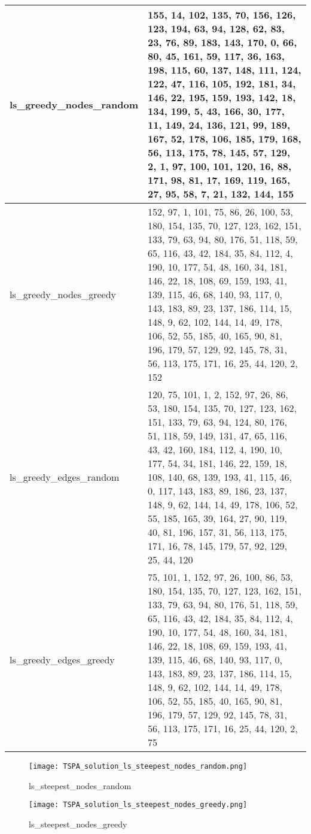 \begin{table}[H]
\begin{tabular}{|p{0.25\linewidth}|p{0.75\linewidth}|}
\hline
ls\_greedy\_nodes\_random & 155, 14, 102, 135, 70, 156, 126, 123, 194, 63, 94, 128, 62, 83, 23, 76, 89, 183, 143, 170, 0, 66, 80, 45, 161, 59, 117, 36, 163, 198, 115, 60, 137, 148, 111, 124, 122, 47, 116, 105, 192, 181, 34, 146, 22, 195, 159, 193, 142, 18, 134, 199, 5, 43, 166, 30, 177, 11, 149, 24, 136, 121, 99, 189, 167, 52, 178, 106, 185, 179, 168, 56, 113, 175, 78, 145, 57, 129, 2, 1, 97, 100, 101, 120, 16, 88, 171, 98, 81, 17, 169, 119, 165, 27, 95, 58, 7, 21, 132, 144, 155 \\
\hline
ls\_greedy\_nodes\_greedy & 152, 97, 1, 101, 75, 86, 26, 100, 53, 180, 154, 135, 70, 127, 123, 162, 151, 133, 79, 63, 94, 80, 176, 51, 118, 59, 65, 116, 43, 42, 184, 35, 84, 112, 4, 190, 10, 177, 54, 48, 160, 34, 181, 146, 22, 18, 108, 69, 159, 193, 41, 139, 115, 46, 68, 140, 93, 117, 0, 143, 183, 89, 23, 137, 186, 114, 15, 148, 9, 62, 102, 144, 14, 49, 178, 106, 52, 55, 185, 40, 165, 90, 81, 196, 179, 57, 129, 92, 145, 78, 31, 56, 113, 175, 171, 16, 25, 44, 120, 2, 152 \\
\hline
ls\_greedy\_edges\_random & 120, 75, 101, 1, 2, 152, 97, 26, 86, 53, 180, 154, 135, 70, 127, 123, 162, 151, 133, 79, 63, 94, 124, 80, 176, 51, 118, 59, 149, 131, 47, 65, 116, 43, 42, 160, 184, 112, 4, 190, 10, 177, 54, 34, 181, 146, 22, 159, 18, 108, 140, 68, 139, 193, 41, 115, 46, 0, 117, 143, 183, 89, 186, 23, 137, 148, 9, 62, 144, 14, 49, 178, 106, 52, 55, 185, 165, 39, 164, 27, 90, 119, 40, 81, 196, 157, 31, 56, 113, 175, 171, 16, 78, 145, 179, 57, 92, 129, 25, 44, 120 \\
\hline
ls\_greedy\_edges\_greedy & 75, 101, 1, 152, 97, 26, 100, 86, 53, 180, 154, 135, 70, 127, 123, 162, 151, 133, 79, 63, 94, 80, 176, 51, 118, 59, 65, 116, 43, 42, 184, 35, 84, 112, 4, 190, 10, 177, 54, 48, 160, 34, 181, 146, 22, 18, 108, 69, 159, 193, 41, 139, 115, 46, 68, 140, 93, 117, 0, 143, 183, 89, 23, 137, 186, 114, 15, 148, 9, 62, 102, 144, 14, 49, 178, 106, 52, 55, 185, 40, 165, 90, 81, 196, 179, 57, 129, 92, 145, 78, 31, 56, 113, 175, 171, 16, 25, 44, 120, 2, 75 \\
\hline
\end{tabular}
\end{table}


\begin{figure}[!htbp]
\centering
\texttt{[image: TSPA\_solution\_ls\_steepest\_nodes\_random.png]}
\caption{\label{fig:frog}ls\_steepest\_nodes\_random}
\end{figure}

\begin{figure}[!htbp]
\centering
\texttt{[image: TSPA\_solution\_ls\_steepest\_nodes\_greedy.png]}
\caption{\label{fig:frog}ls\_steepest\_nodes\_greedy}
\end{figure}

